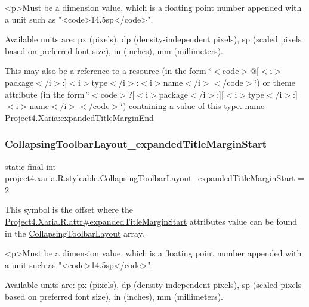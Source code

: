 \begin{DoxyVerb}      <p>Must be a dimension value, which is a floating point number appended with a unit such as "<code>14.5sp</code>".
\end{DoxyVerb}
 Available units are\+: px (pixels), dp (density-\/independent pixels), sp (scaled pixels based on preferred font size), in (inches), mm (millimeters). 

This may also be a reference to a resource (in the form \char`\"{}$<$code$>$@\mbox{[}$<$i$>$package$<$/i$>$\+:\mbox{]}$<$i$>$type$<$/i$>$\+:$<$i$>$name$<$/i$>$$<$/code$>$\char`\"{}) or theme attribute (in the form \char`\"{}$<$code$>$?\mbox{[}$<$i$>$package$<$/i$>$\+:\mbox{]}\mbox{[}$<$i$>$type$<$/i$>$\+:\mbox{]}$<$i$>$name$<$/i$>$$<$/code$>$\char`\"{}) containing a value of this type.  name Project4.\+Xaria\+:expanded\+Title\+Margin\+End \mbox{\label{classproject4_1_1xaria_1_1R_1_1styleable_a0dbfb6e3b88ea621358c4ea2f5acc61f}} 
\subsubsection{\texorpdfstring{Collapsing\+Toolbar\+Layout\+\_\+expanded\+Title\+Margin\+Start}{CollapsingToolbarLayout\_expandedTitleMarginStart}}
{\footnotesize\ttfamily static final int project4.\+xaria.\+R.\+styleable.\+Collapsing\+Toolbar\+Layout\+\_\+expanded\+Title\+Margin\+Start = 2\hspace{0.3cm}{\ttfamily [static]}}

This symbol is the offset where the \hyperlink{}{Project4.\+Xaria.\+R.\+attr\#expanded\+Title\+Margin\+Start} attribute\textquotesingle{}s value can be found in the \hyperlink{classproject4_1_1xaria_1_1R_1_1styleable_ac131ed2b7e0e7f05b58231242478b839}{Collapsing\+Toolbar\+Layout} array.

\begin{DoxyVerb}      <p>Must be a dimension value, which is a floating point number appended with a unit such as "<code>14.5sp</code>".
\end{DoxyVerb}
 Available units are\+: px (pixels), dp (density-\/independent pixels), sp (scaled pixels based on preferred font size), in (inches), mm (millimeters). 

